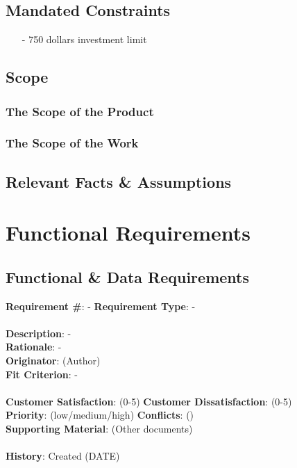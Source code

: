 \documentclass[titlepage]{article}
\begin{document}
\subsection{Mandated Constraints}%
\begin{itemize}
	\item[-] 750 dollars investment limit
\end{itemize}

\subsection{Scope}
\subsubsection{The Scope of the Product}
\subsubsection{The Scope of the Work}
\subsection{Relevant Facts \& Assumptions}


\section{Functional Requirements}
\subsection{Functional \& Data Requirements}
\begin{framed}
\noindent\textbf{Requirement \#}: - \hfill \textbf{Requirement Type}: - \hfill\\\\
\noindent\textbf{Description}: -\\
\textbf{Rationale}: -\\
\textbf{Originator}: (Author)\\
\textbf{Fit Criterion}: -\\\\
\noindent\textbf{Customer Satisfaction}: (0-5) \hfill 	\textbf{Customer Dissatisfaction}: (0-5) \hfill\\
\textbf{Priority}: (low/medium/high) \hfill \textbf{Conflicts}: () \hfill 		\\
\textbf{Supporting Material}: (Other documents)\\\\
\noindent\textbf{History}: Created (DATE)
\end{framed}
\end{document}
